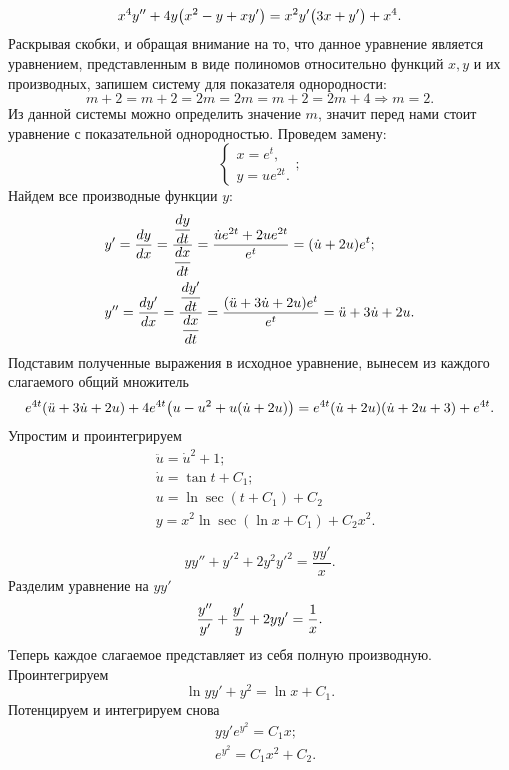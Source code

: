         \[
            x^4y'' + 4y \bigl( x^2 - y + xy' \bigr) = x^2 y' \bigl( 3x + y' \bigr) + x^4.
        \]
        Раскрывая скобки, и обращая внимание на то, что данное уравнение является уравнением, представленным в виде полиномов относительно функций $ x, y $ и их производных, запишем систему для показателя однородности:
        \[
            m + 2 = m + 2 = 2m = 2m = m + 2 = 2m + 4 \Longrightarrow m = 2.
        \]
        Из данной системы можно определить значение $ m $, значит перед нами стоит уравнение с показательной однородностью. Проведем замену:
        \[
            \begin{cases}
                x = e^t, \\
                y = ue^{2t}.
            \end{cases};
        \]
        Найдем все производные функции $ y $:
        \[
            \begin{split}
                &y' = \dfrac{d y}{d x} = \dfrac{\dfrac{d y}{d t}}{\dfrac{d x}{d t}} = \dfrac{\dot{u}e^{2t} + 2u e^{2t}}{e^t} = (\dot{u} + 2u)e^t; \\
                &y'' = \dfrac{d y'}{d x} = \dfrac{\dfrac{d y'}{d t}}{\dfrac{d x}{d t}} = \dfrac{(\ddot{u} + 3\dot{u} + 2u)e^t}{e^t} = \ddot{u} + 3\dot{u} + 2u.
            \end{split}
        \]
        Подставим полученные выражения в исходное уравнение, вынесем из каждого слагаемого общий множитель
        \[
            e^{4t} (\ddot{u} + 3\dot{u} + 2u) + 4e^{4t} \bigl( u - u^2 + u(\dot{u} + 2u) \bigr) = e^{4t} (\dot{u} + 2u) (\dot{u} + 2u + 3) + e^{4t}.
        \]
        Упростим и проинтегрируем
        \[
            \begin{split}
                &\ddot{u} = \dot{u}^2 + 1; \\
                &\dot{u} = \tan{t + C_1}; \\
                &u = \ln{\sec{(t + C_1)}} + C_2 \\
                &y = x^2 \ln{\sec{(\ln{x} + C_1)}} + C_2 x^2.
            \end{split}
        \]

        \[
            yy'' + {y'}^2 + 2y^2{y'}^2 = \dfrac{yy'}{x}.
        \]
        Разделим уравнение на $ yy' $
        \[
            \dfrac{y''}{y'} + \dfrac{y'}{y} + 2yy' = \dfrac{1}{x}.
        \]
        Теперь каждое слагаемое представляет из себя полную производную. Проинтегрируем
        \[
            \ln{yy'} + y^2 = \ln{x} + C_1.
        \]
        Потенцируем и интегрируем снова
        \[
            \begin{split}
                &yy'e^{y^2} = C_1 x; \\
                &e^{y^2} = C_1 x^2 + C_2.
            \end{split}
        \]
